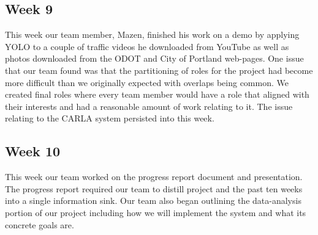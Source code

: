 \documentclass[onecolumn, draftclsnofoot,10pt, compsoc]{IEEEtran}
\begin{document}
\subsection{Week 9}
This week our team member, Mazen, finished his work on a demo by applying YOLO to a couple of traffic videos he downloaded from YouTube as well as photos downloaded from the ODOT and City of Portland web-pages. One issue that our team found was that the partitioning of roles for the project had become more difficult than we originally expected with overlaps being common. We created final roles where every team member would have a role that aligned with their interests and had a reasonable amount of work relating to it. The issue relating to the CARLA system persisted into this week.  

\subsection{Week 10}
This week our team worked on the progress report document and presentation. The progress report required our team to distill project and the past ten weeks into a single information sink. Our team also began outlining the data-analysis portion of our project including how we will implement the system and what its concrete goals are. 
\end{document}
